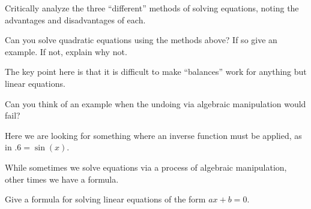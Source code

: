 \begin{prob}
Critically analyze the three ``different'' methods of solving
equations, noting the advantages and disadvantages of each. 
\end{prob}

\begin{prob}
Can you solve quadratic equations using the methods above?
If so give an example. If not, explain why not.
\end{prob}

\begin{teachingnote}
The key point here is that it is difficult to make ``balances'' work
for anything but linear equations.
\end{teachingnote}



\begin{prob}
Can you think of an example when the undoing via algebraic
manipulation would fail?
\end{prob}

\begin{teachingnote}
Here we are looking for something where an inverse function must be
applied, as in $.6 = \sin(x)$.
\end{teachingnote}


While sometimes we solve equations via a process of algebraic
manipulation, other times we have a formula.


\begin{prob}
Give a formula for solving linear equations of the form $ax + b =0$.
\end{prob}




